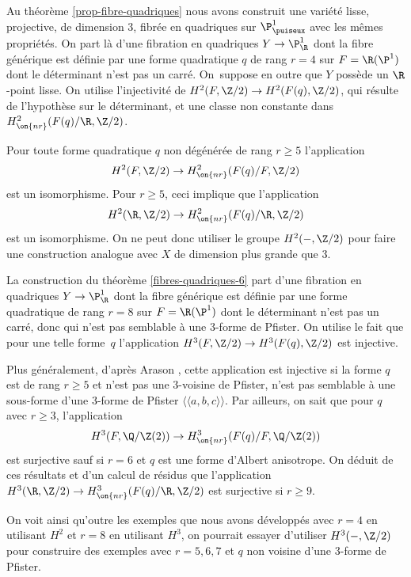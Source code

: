 \begin{rmk}\label{autrescontrex} Au théorème \ref{prop-fibre-quadriques} nous avons construit une variété
lisse, projective, de dimension $3$, fibrée en quadriques sur $\P^1_{\puiseux}$ avec les mêmes propriétés.
On part là d'une fibration
en quadriques $Y \to \P^1_\R$ dont la fibre générique est définie par une forme quadratique $q$ de rang $r=4$ sur $F=\R(\P^1)$
dont le déterminant n'est pas un carré. On~suppose en outre
que $Y$ possède un $\R$-point lisse.
On utilise
l'injectivité de $H^2(F,\Z/2) \to H^2(F(q), \Z/2)$,
qui résulte de l'hypothèse sur le déterminant,
et une classe non constante dans $H^2_{\on{nr}}(F(q)/\R, \Z/2)$.

Pour toute forme quadratique $q$ non dégénérée de rang $r\geq 5$
l'application \[
H^2(F,\Z/2) \to H^2_{\on{nr}}(F(q)/F, \Z/2)
\]
est un isomorphisme.
Pour $r\geq 5$, ceci implique que l'application
\[
H^2(\R,\Z/2) \to H^2_{\on{nr}}(F(q)/\R, \Z/2)
\]
est un isomorphisme.
On ne peut donc utiliser le groupe
$H^2(-, \Z/2)$ pour faire une construction analogue
avec $X$ de dimension plus grande que 3.

La construction du théorème \ref{fibres-quadriques-6}
part d'une fibration
en quadriques $Y \to \P^1_\R$ dont la fibre générique est définie par une forme quadratique de rang $r= 8$ sur $F=\R(\P^1)$
dont le déterminant n'est pas un carré, donc qui n'est pas semblable à une 3-forme de Pfister.
On utilise le fait que pour une telle forme~$q$ l'application
$H^3(F,\Z/2) \to H^3(F(q), \Z/2)$ est injective.

Plus généralement, d'après Arason \cite[Satz 5.6]{arason1975cohomologische},
cette application est injective si la forme $q$
est de rang $r\geq 5$ et n'est pas une 3-voisine de Pfister, \ie
n'est pas semblable à une sous-forme d'une 3-forme
de Pfister $\langle \!\langle a,b,c \rangle \!\rangle$.
Par ailleurs, on sait \cite[Th.\,10.2.4]{kahn2008formes} que pour $q$ avec $r\geq 3$, l'application
\[
H^3(F, \Q/\Z(2)) \to H^3_{\on{nr}}(F(q)/F, \Q/\Z(2))
\]
est surjective sauf si $r=6$ et $q$
est une forme d'Albert anisotrope.
On déduit de ces résultats et d'un calcul de résidus
que l'application $H^3(\R, \Z/2) \to H^3_{\on{nr}}(F(q)/\R, \Z/2)$
est surjective si $r\geq 9$.

On voit ainsi qu'outre les exemples que nous avons développés avec $r=4$ en utilisant $H^2$ et $r=8$ en utilisant $H^3$, on pourrait essayer d'utiliser $H^3(-, \Z/2)$ pour construire des exemples avec $r=5,6,7$ et $q$ non voisine d'une 3-forme de Pfister.
\end{rmk}

